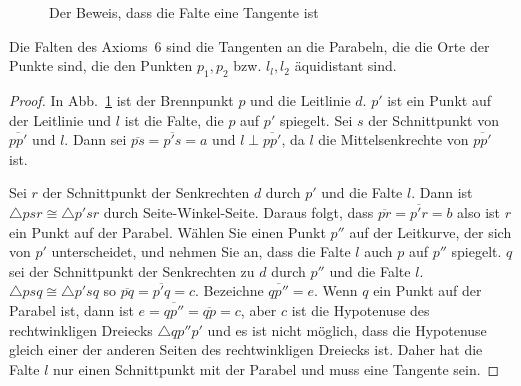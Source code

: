 \begin{figure}[b]
\begin{center}
\end{center}
\caption{Der Beweis, dass die Falte eine Tangente ist}\label{f.tangent-proof}
\end{figure}

\begin{theorem}\label{thm.parabola-tangents}
Die Falten des Axioms~$6$ sind die Tangenten an die Parabeln, die die Orte der Punkte sind, die den Punkten $p_1,p_2$ bzw. $l_l,l_2$ äquidistant sind.
\end{theorem}
\begin{proof}
In Abb.~\ref{f.tangent-proof} ist der Brennpunkt $p$ und die Leitlinie $d$. $p'$ ist ein Punkt auf der Leitlinie und $l$ ist die Falte, die $p$ auf $p'$ spiegelt. Sei $s$ der Schnittpunkt von $\overline{pp'}$ und $l$. Dann sei $\overline{ps}=\overline{p's}=a$ und $l\perp \overline{pp'}$, da $l$ die Mittelsenkrechte von $\overline{pp'}$ ist.

Sei $r$ der Schnittpunkt der Senkrechten $d$ durch $p'$ und die Falte $l$. Dann ist $\triangle psr\cong \triangle p'sr$ durch Seite-Winkel-Seite. Daraus folgt, dass 
$\overline{pr}=\overline{p'r}=b$ also ist $r$ ein Punkt auf der Parabel. Wählen Sie einen Punkt $p''$ auf der Leitkurve, der sich von $p'$ unterscheidet, und nehmen Sie an, dass die Falte $l$ auch $p$ auf $p''$ spiegelt. $q$ sei der Schnittpunkt der Senkrechten zu $d$ durch $p''$ und die Falte $l$. $\triangle psq\cong \triangle p'sq$ so $\overline{pq}=\overline{p'q}=c$. Bezeichne $\overline{qp''}=e$. Wenn $q$ ein Punkt auf der Parabel ist, dann ist $e=\overline{qp''}=\overline{qp}=c$, aber $c$ ist die Hypotenuse des rechtwinkligen Dreiecks $\triangle qp''p'$ und es ist nicht möglich, dass die Hypotenuse gleich einer der anderen Seiten des rechtwinkligen Dreiecks ist. Daher hat die Falte $l$ nur einen Schnittpunkt mit der Parabel und muss eine Tangente sein.
\end{proof}

